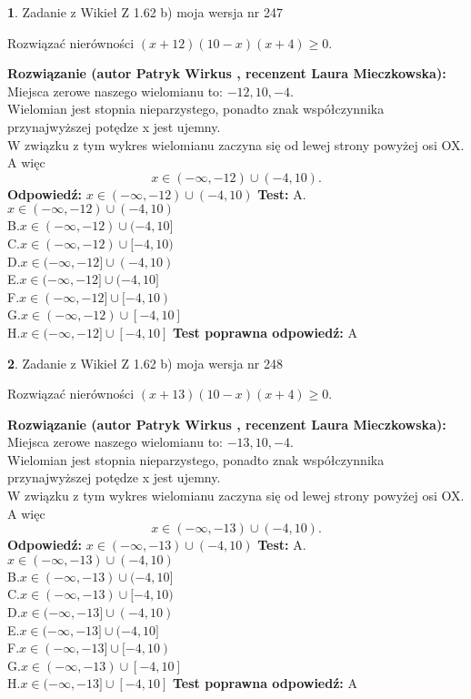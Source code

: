 \documentclass[12pt, a4paper]{article}
\theoremstyle{definition} %
\newtheorem{zad}{}
\newcommand{\zadStart}[1]{\begin{zad}#1\newline}
\newcommand{\zadStop}{\end{zad}}
\newcommand{\rozwStart}[2]{\noindent \textbf{Rozwiązanie (autor #1 , recenzent #2): }\newline}
\newcommand{\rozwStop}{\newline}
\newcommand{\odpStart}{\noindent \textbf{Odpowiedź:}\newline}
\newcommand{\odpStop}{\newline}
\newcommand{\testStart}{\noindent \textbf{Test:}\newline}
\newcommand{\testStop}{\newline}
\newcommand{\kluczStart}{\noindent \textbf{Test poprawna odpowiedź:}\newline}
\newcommand{\kluczStop}{\newline}
\begin{document}
\zadStart{Zadanie z Wikieł Z 1.62 b) moja wersja nr 247}

Rozwiązać nierówności $(x+12)(10-x)(x+4)\ge0$.
\zadStop
\rozwStart{Patryk Wirkus}{Laura Mieczkowska}
Miejsca zerowe naszego wielomianu to: $-12, 10, -4$.\\
Wielomian jest stopnia nieparzystego, ponadto znak współczynnika przy\linebreak najwyższej potędze x jest ujemny.\\ W związku z tym wykres wielomianu zaczyna się od lewej strony powyżej osi OX. A więc $$x \in (-\infty,-12) \cup (-4,10).$$
\rozwStop
\odpStart
$x \in (-\infty,-12) \cup (-4,10)$
\odpStop
\testStart
A.$x \in (-\infty,-12) \cup (-4,10)$\\
B.$x \in (-\infty,-12) \cup (-4,10]$\\
C.$x \in (-\infty,-12) \cup [-4,10)$\\
D.$x \in (-\infty,-12] \cup (-4,10)$\\
E.$x \in (-\infty,-12] \cup (-4,10]$\\
F.$x \in (-\infty,-12] \cup [-4,10)$\\
G.$x \in (-\infty,-12) \cup [-4,10]$\\
H.$x \in (-\infty,-12] \cup [-4,10]$
\testStop
\kluczStart
A
\kluczStop



\zadStart{Zadanie z Wikieł Z 1.62 b) moja wersja nr 248}

Rozwiązać nierówności $(x+13)(10-x)(x+4)\ge0$.
\zadStop
\rozwStart{Patryk Wirkus}{Laura Mieczkowska}
Miejsca zerowe naszego wielomianu to: $-13, 10, -4$.\\
Wielomian jest stopnia nieparzystego, ponadto znak współczynnika przy\linebreak najwyższej potędze x jest ujemny.\\ W związku z tym wykres wielomianu zaczyna się od lewej strony powyżej osi OX. A więc $$x \in (-\infty,-13) \cup (-4,10).$$
\rozwStop
\odpStart
$x \in (-\infty,-13) \cup (-4,10)$
\odpStop
\testStart
A.$x \in (-\infty,-13) \cup (-4,10)$\\
B.$x \in (-\infty,-13) \cup (-4,10]$\\
C.$x \in (-\infty,-13) \cup [-4,10)$\\
D.$x \in (-\infty,-13] \cup (-4,10)$\\
E.$x \in (-\infty,-13] \cup (-4,10]$\\
F.$x \in (-\infty,-13] \cup [-4,10)$\\
G.$x \in (-\infty,-13) \cup [-4,10]$\\
H.$x \in (-\infty,-13] \cup [-4,10]$
\testStop
\kluczStart
A
\kluczStop
\end{document}
